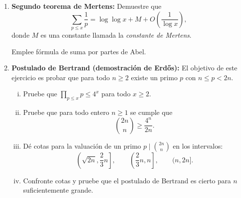 \documentclass[11pt, reqno]{amsart}
\begin{document}
\begin{enumerate}
		\newex
	\item
		\textbf{Segundo teorema de Mertens:} Demuestre que
		$$ \sum_{p\le x} \frac{1}{p} = \log\log x + M + O\left( \frac{1}{\log x} \right), $$
		donde $M$ es una constante llamada la \textit{constante de Mertens}.
		\nocite{tenenbaum:analytique}
		\begin{hint}
			Emplee fórmula de suma por partes de Abel.
		\end{hint}

		\newex
	\item\lookst
		\textbf{Postulado de Bertrand (demostración de Erd\H os):}
		El objetivo de este ejercicio es probar que para todo $n \ge 2$ existe un primo $p$ con $n \le p < 2n$.
		\begin{enumerate}[(i)]
			\item Pruebe que $\prod_{p\le x} p \le 4^x$ para todo $x \ge 2$.
			\item Pruebe que para todo entero $n \ge 1$ se cumple que
				\[
					\binom{2n}{n} \ge \frac{4^n}{2n}.
				\]
			\item Dé cotas para la valuación de un primo $p \mid \binom{2n}{n}$ en los intervalos:
				\[
					\left(\sqrt{2n}, \frac{2}{3} n\right], \qquad \left(\frac{2}{3} n, n\right], \qquad (n, 2n].
				\]
			\item Confronte cotas y pruebe que el postulado de Bertrand es cierto para $n$ suficientemente grande.
		\end{enumerate}
		\nocite{granville:masterclass}
\end{enumerate}

\begin{additional}


\printbibliography[title={Referencias y lecturas adicionales}]
\end{additional}
\end{document}
